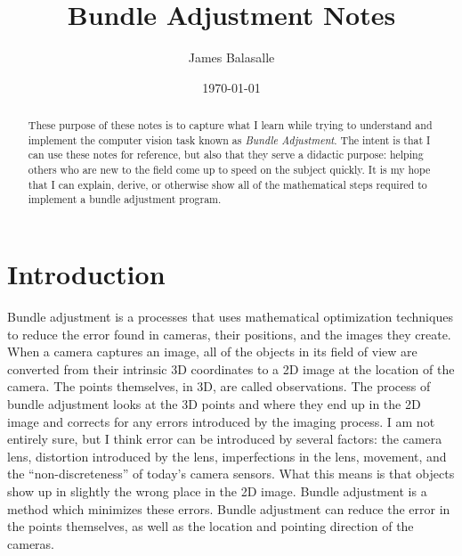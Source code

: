 \documentclass{article}
\title{Bundle Adjustment Notes}
\author{James Balasalle}
\date{\today}
\begin{document}
\maketitle

\begin{abstract}
  These purpose of these notes is to capture what I learn while trying
  to understand and implement the computer vision task known as
  \emph{Bundle Adjustment}.  The intent is that I can use these notes
  for reference, but also that they serve a didactic purpose: helping
  others who are new to the field come up to speed on the subject
  quickly.  It is my hope that I can explain, derive, or otherwise
  show all of the mathematical steps required to implement a bundle
  adjustment program.
\end{abstract}

\section{Introduction}
\label{sec:intro}

Bundle adjustment is a processes that uses mathematical optimization
techniques to reduce the error found in cameras, their positions, and
the images they create.  When a camera captures an image, all of the
objects in its field of view are converted from their intrinsic 3D
coordinates to a 2D image at the location of the camera.  The points
themselves, in 3D, are called observations.  The process of bundle
adjustment looks at the 3D points and where they end up in the 2D
image and corrects for any errors introduced by the imaging process.
I am not entirely sure, but I think error can be introduced by several
factors: the camera lens, distortion introduced by the lens,
imperfections in the lens, movement, and the ``non-discreteness'' of
today's camera sensors.  What this means is that objects show up in
slightly the wrong place in the 2D image.  Bundle adjustment is a
method which minimizes these errors.  Bundle adjustment can reduce the
error in the points themselves, as well as the location and pointing
direction of the cameras.
\end{document}
